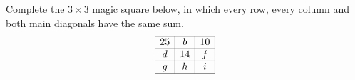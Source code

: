 Complete the $3\times3$ magic square below, in which every row, every column and both main diagonals have the same sum.
\[
\begin{array}{|c|c|c|}\hline 25 & b & 10\\ \hline d & 14 & f\\ \hline g & h & i\\ \hline\end{array}
\]
